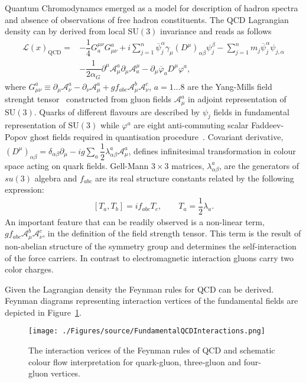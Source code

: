 Quantum Chromodynamcs emerged as a model for description of hadron spectra and absence of observations of free hadron constituents. The QCD Lagrangian density can by derived from local $\mathrm{SU}\left(3\right)$ invariance and reads as follows
\begin{align}
 \mathcal{L}\left( x\right)_{\mathrm{QCD}}  = & -\dfrac{1}{4}G_a^{\mu\nu}G_{\mu\nu}^a + i\sum_{j=1}^n{\overline{\psi}^{\alpha}_j \gamma_\mu \left( D^\mu \right)_{\alpha\beta} \psi_j^\beta } - \sum_{j=1}^n{m_j\overline{\psi}^{\alpha}_j\psi_{j,\alpha}} \\
					      & - \dfrac{1}{2\alpha_G} \partial^\mu \mathcal{A}^a_\mu \partial_\mu \mathcal{A}_a^\mu - \partial_\mu \overline{\varphi}_a D^\mu \varphi^a,
\end{align}
where $G_{\mu\nu}^a \equiv \partial_\mu \mathcal{A}^a_\nu - \partial_\nu \mathcal{A}^a_\mu + gf_{abc}\mathcal{A}^b_\mu \mathcal{A}^c_\nu $, $a=1 \ldots 8$ are the Yang-Mills field strenght tensor~\cite{C.N. Yang and R.L. Mills, Phys. Rev. 96 (1954) 191.} constructed from gluon fields $\mathcal{A}^a_\mu$ in adjoint representation of $\mathrm{SU}\left(3\right)$. Quarks of different flavours are described by $\psi_j$ fields in fundamental representation of $\mathrm{SU}\left(3\right)$ while $\varphi^a$ are eight anti-commuting scalar Faddeev-Popov ghost fields required in quantisation procedure~\cite{L.D. Faddeev and Y.N Popov, Phys. Lett. B 25 (1967) 29;
B. De Wit, Phys. Rev. Lett. 12 (1964) 742.}. Covariant derivative, $\left( D^\mu \right)_{\alpha\beta} = \delta_{\alpha\beta}\partial_\mu - ig\sum_a{\dfrac{1}{2}\lambda^a_{\alpha\beta}\mathcal{A}^a_\mu}$, defines infinitesimal transformation in colour space acting on quark fields. Gell-Mann $3\times 3$ matrices, $\lambda^a_{\alpha\beta}$, are the generators of $su\left(3\right)$ algebra and $f_{abc}$ are its real structure constants related by the following expression:
\begin{align}
 \left[T_a,T_b\right] = if_{abc}T_c,\qquad T_a = \dfrac{1}{2}\lambda_a.
\end{align}
An important feature that can be readily observed is a non-linear term, $gf_{abc}\mathcal{A}^b_\mu \mathcal{A}^c_\nu$, in the definition of the field strength tensor. This term is the result of non-abelian structure of the symmetry group and determines the self-interaction of the force carriers. In contrast to electromagnetic interaction gluons carry two color charges. 

Given the Lagrangian density the Feynman rules for QCD can be derived.  Feynman diagrams representing interaction vertices of the fundamental fields are depicted in Figure~\ref{fig:FundamentalQCDInteractions}.
\begin{figure}[t]
	\centering
		\texttt{[image: ./Figures/source/FundamentalQCDInteractions.png]}
	\caption{The interaction verices of the Feynman rules of QCD and schematic colour flow interpretation for quark-gluon, three-gluon and four-gluon vertices.}
	\label{fig:FundamentalQCDInteractions}
\end{figure}

